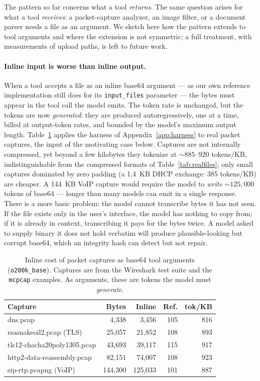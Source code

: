 \documentclass[11pt]{article}
\begin{document}
The pattern so far concerns what a tool \emph{returns}. The same question arises for what a tool \emph{receives}: a packet-capture analyzer, an image filter, or a document parser needs a file as an argument. We sketch here how the pattern extends to tool arguments and where the extension is not symmetric; a full treatment, with measurements of upload paths, is left to future work.

\paragraph{Inline input is worse than inline output.} When a tool accepts a file as an inline base64 argument --- as our own reference implementation still does for its \texttt{input\_files} parameter --- the bytes must appear in the tool call the model emits. The token rate is unchanged, but the tokens are now \emph{generated}: they are produced autoregressively, one at a time, billed at output-token rates, and bounded by the model's maximum output length. Table~\ref{tab:pcap} applies the harness of Appendix~\ref{app:harness} to real packet captures, the input of the motivating case below. Captures are not internally compressed, yet beyond a few kilobytes they tokenize at ${\sim}885$--$920$ tokens/KB, indistinguishable from the compressed formats of Table~\ref{tab:realfiles}; only small captures dominated by zero padding (a 1.4~KB DHCP exchange: 385 tokens/KB) are cheaper. A 144~KB VoIP capture would require the model to \emph{write} ${\sim}125{,}000$ tokens of base64 --- longer than many models can emit in a single response. There is a more basic problem: the model cannot transcribe bytes it has not seen. If the file exists only in the user's interface, the model has nothing to copy from; if it is already in context, transcribing it pays for the bytes twice. A model asked to supply binary it does not hold verbatim will produce plausible-looking but corrupt base64, which an integrity hash can detect but not repair.

\begin{table}[htbp]\centering
\caption{Inline cost of packet captures as base64 tool arguments (\texttt{o200k\_base}). Captures are from the Wireshark test suite and the \texttt{mcpcap} examples. As arguments, these are tokens the model must \emph{generate}.}\label{tab:pcap}
\begin{tabular}{lrrrr}
\toprule
Capture & Bytes & Inline & Ref. & tok/KB \\
\midrule
dns.pcap                     & 4{,}338   & 3{,}456   & 105 & 816 \\
rsasnakeoil2.pcap (TLS)      & 25{,}057  & 21{,}852  & 108 & 893 \\
tls12-chacha20poly1305.pcap  & 43{,}693  & 39{,}117  & 115 & 917 \\
http2-data-reassembly.pcap   & 82{,}151  & 74{,}007  & 108 & 923 \\
sip-rtp.pcapng (VoIP)        & 144{,}300 & 125{,}033 & 101 & 887 \\
\bottomrule
\end{tabular}
\end{table}
\end{document}
